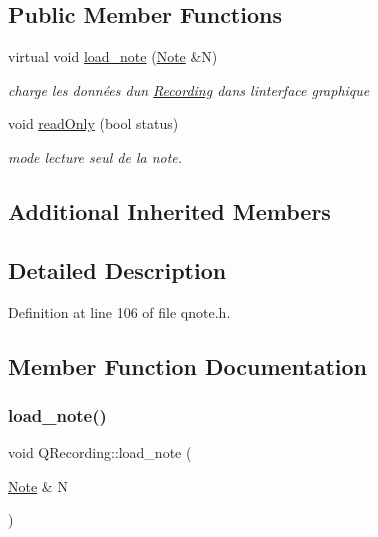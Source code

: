 \subsection*{Public Member Functions}
\begin{DoxyCompactItemize}
\item 
virtual void \hyperlink{class_q_recording_aa6984351b5a0bceaa63be793b160c73b}{load\+\_\+note} (\hyperlink{class_note}{Note} \&N)
\begin{DoxyCompactList}\small\item\em charge les données d\textquotesingle{}un \hyperlink{class_recording}{Recording} dans l\textquotesingle{}interface graphique \end{DoxyCompactList}\item 
void \hyperlink{class_q_recording_a98fa21d8814450c0d912c8ce102ca832}{read\+Only} (bool status)
\begin{DoxyCompactList}\small\item\em mode lecture seul de la note. \end{DoxyCompactList}\end{DoxyCompactItemize}
\subsection*{Additional Inherited Members}


\subsection{Detailed Description}


Definition at line 106 of file qnote.\+h.



\subsection{Member Function Documentation}
\mbox{\label{class_q_recording_aa6984351b5a0bceaa63be793b160c73b}} 
\subsubsection{\texorpdfstring{load\+\_\+note()}{load\_note()}}
{\footnotesize\ttfamily void Q\+Recording\+::load\+\_\+note (\begin{DoxyParamCaption}\item[{\hyperlink{class_note}{Note} \&}]{N }\end{DoxyParamCaption})\hspace{0.3cm}{\ttfamily [virtual]}}



